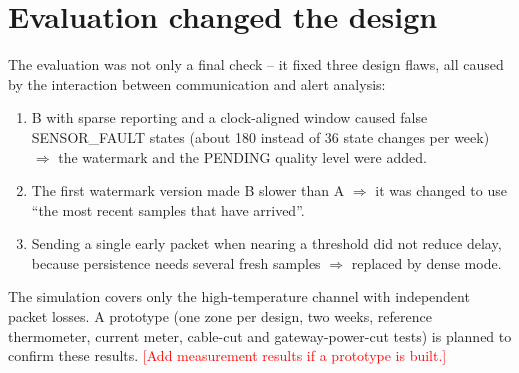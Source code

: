 \documentclass[11pt,a4paper]{report}
\newcommand{\todo}[1]{\textcolor{red}{[#1]}}
\begin{document}
\section{Evaluation changed the design}
The evaluation was not only a final check -- it fixed three design flaws, all caused by the interaction between communication and alert analysis:
\begin{enumerate}[noitemsep]
  \item B with sparse reporting and a clock-aligned window caused false SENSOR\_FAULT states (about 180 instead of 36 state changes per week) $\Rightarrow$ the watermark and the PENDING quality level were added.
  \item The first watermark version made B slower than A $\Rightarrow$ it was changed to use ``the most recent samples that have arrived''.
  \item Sending a single early packet when nearing a threshold did not reduce delay, because persistence needs several fresh samples $\Rightarrow$ replaced by dense mode.
\end{enumerate}
The simulation covers only the high-temperature channel with independent packet losses. A prototype (one zone per design, two weeks, reference thermometer, current meter, cable-cut and gateway-power-cut tests) is planned to confirm these results. \todo{Add measurement results if a prototype is built.}

\end{document}
